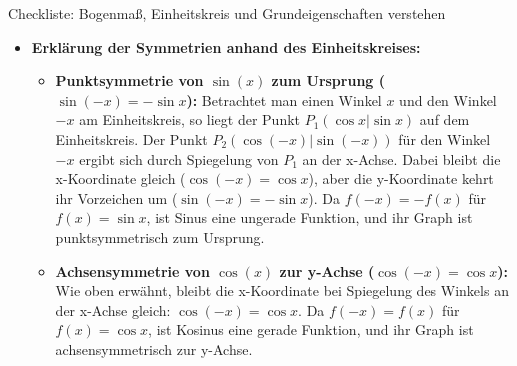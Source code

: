 \begin{loesungsumgebung}{Checkliste: Bogenmaß, Einheitskreis und Grundeigenschaften verstehen}
\begin{enumerate}[label=(\alph*)]
\begin{itemize}
        \item \textbf{Erklärung der Symmetrien anhand des Einheitskreises:}
        \begin{itemize}
            \item \textbf{Punktsymmetrie von $\sin(x)$ zum Ursprung ($\sin(-x)=-\sin x$):}
            Betrachtet man einen Winkel $x$ und den Winkel $-x$ am Einheitskreis, so liegt der Punkt $P_1(\cos x | \sin x)$ auf dem Einheitskreis. Der Punkt $P_2(\cos(-x) | \sin(-x))$ für den Winkel $-x$ ergibt sich durch Spiegelung von $P_1$ an der x-Achse. Dabei bleibt die x-Koordinate gleich ($\cos(-x)=\cos x$), aber die y-Koordinate kehrt ihr Vorzeichen um ($\sin(-x)=-\sin x$). Da $f(-x)=-f(x)$ für $f(x)=\sin x$, ist Sinus eine ungerade Funktion, und ihr Graph ist punktsymmetrisch zum Ursprung.
            \item \textbf{Achsensymmetrie von $\cos(x)$ zur y-Achse ($\cos(-x)=\cos x$):}
            Wie oben erwähnt, bleibt die x-Koordinate bei Spiegelung des Winkels an der x-Achse gleich: $\cos(-x)=\cos x$. Da $f(-x)=f(x)$ für $f(x)=\cos x$, ist Kosinus eine gerade Funktion, und ihr Graph ist achsensymmetrisch zur y-Achse.
        \end{itemize}
    \end{itemize}
\end{enumerate}

\end{loesungsumgebung}

